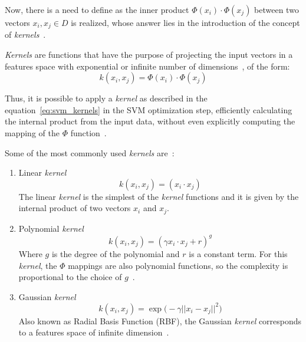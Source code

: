 Now, there is a need to define as the inner product $\Phi(x_i) \cdot \Phi(x_j)$ between two vectors $x_i, x_j \in D$ is realized, whose answer lies in the introduction of the concept of \emph{kernels}~\citep{lorena:03}.

\emph{Kernels} are functions that have the purpose of projecting the input vectors in a features space with exponential or infinite number of dimensions~\citep{taylor:04}, of the form:
\begin{equation}
\label{eq:svm_kernels}
k(x_i, x_j) =  \Phi(x_i) \cdot \Phi(x_j)
\end{equation}

Thus, it is possible to apply a \emph{kernel} as described in the equation~\ref{eq:svm_kernels} in the SVM optimization step, efficiently calculating the internal product from the input data, without even explicitly computing the mapping of the $\Phi$ function~\citep{taylor:04}.

Some of the most commonly used \emph{kernels} are~\citep{lorena:03}:
\begin{enumerate}[label=(\roman*)]
\item Linear \emph{kernel}
\begin{equation}
\label{eq:svm_kernel_linear}
k(x_i, x_j) =  (x_i \cdot x_j)
\end{equation}
The linear \emph{kernel} is the simplest of the \emph{kernel} functions and it is given by the internal product of two vectors $x_i$ and $x_j$.

\item Polynomial \emph{kernel}
\begin{equation}
\label{eq:svm_kernel_polinomial}
k(x_i, x_j) =  ({\gamma x_i \cdot x_j + r} )^g
\end{equation}
Where $g$ is the degree of the polynomial and $r$ is a constant term. For this \emph{kernel}, the $\Phi$ mappings are also polynomial functions, so the complexity is proportional to the choice of $g$~\citep{lorena:03}.

\item Gaussian \emph{kernel}
\begin{equation}
\label{eq:svm_kernel_rbf}
k(x_i, x_j) =  \exp{\big(-\gamma {||x_i - x_j||}^2 \big)}
\end{equation}
Also known as Radial Basis Function (RBF), the Gaussian \emph{kernel} corresponds to a features space of infinite dimension~\citep{lorena:03}.

\end{enumerate}

